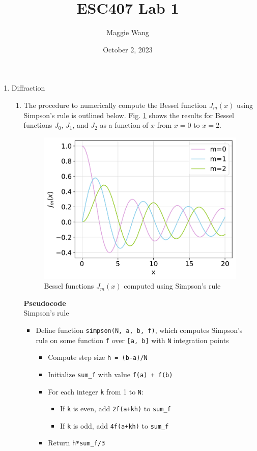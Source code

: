 \documentclass{article}
\newcommand{\code}{\texttt}
\begin{document}
\title{ESC407 Lab 1}

\author{Maggie Wang}

\date{October 2, 2023}
\maketitle

\begin{enumerate}
\item Diffraction
\begin{enumerate}
    \item 
    
    The procedure to numerically compute the Bessel function $J_m(x)$ using Simpson's rule is outlined below. Fig. \ref{fig:1a} shows the results for Bessel functions $J_0$, $J_1$, and $J_2$ as a function of $x$ from $x=0$ to $x=2$.
    
    \begin{figure}[H]
        \centering
        \includegraphics[width=0.6\linewidth]{1a.pdf}
        \caption{\label{fig:1a} Bessel functions $J_m(x)$ computed using Simpson's rule}
    \end{figure} 

    \textbf{Pseudocode}\\
    Simpson's rule 
    \begin{itemize}
        \item Define function \code{simpson(N, a, b, f)}, which computes Simpson's rule on some function \code{f} over \code{[a, b]} with \code{N} integration points
        \begin{itemize}
            \item Compute step size \code{h = (b-a)/N }
            \item Initialize \code{sum\_f} with value \code{f(a) + f(b)}
            \item For each integer \code{k} from 1 to \code{N}:
            \begin{itemize}
                \item If \code{k} is even, add \code{2f(a+kh)} to \code{sum\_f}
                \item If \code{k} is odd, add \code{4f(a+kh)} to \code{sum\_f}
            \end{itemize}
            \item Return \code{h*sum\_f/3}
        \end{itemize}
    \end{itemize}
    

\end{enumerate}
\end{enumerate}
\end{document}
